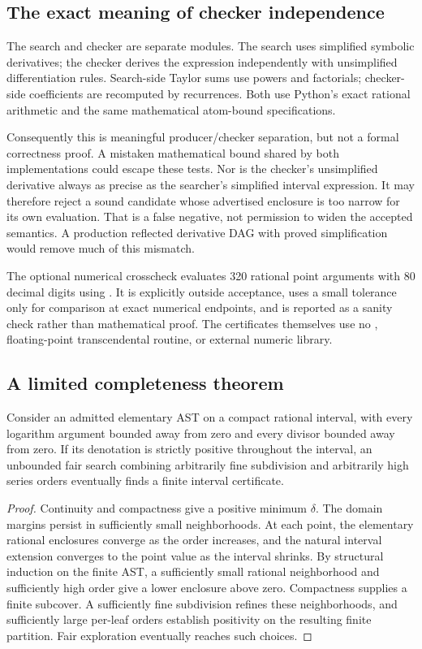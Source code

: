 \subsection{The exact meaning of checker independence}
The search and checker are separate modules. The search uses simplified symbolic derivatives; the checker derives the expression independently with unsimplified differentiation rules. Search-side Taylor sums use powers and factorials; checker-side coefficients are recomputed by recurrences. Both use Python's exact rational arithmetic and the same mathematical atom-bound specifications.

Consequently this is meaningful producer/checker separation, but not a formal correctness proof. A mistaken mathematical bound shared by both implementations could escape these tests. Nor is the checker's unsimplified derivative always as precise as the searcher's simplified interval expression. It may therefore reject a sound candidate whose advertised enclosure is too narrow for its own evaluation. That is a false negative, not permission to widen the accepted semantics. A production reflected derivative DAG with proved simplification would remove much of this mismatch.

The optional numerical crosscheck evaluates 320 rational point arguments with 80 decimal digits using . It is explicitly outside acceptance, uses a small tolerance only for comparison at exact numerical endpoints, and is reported as a sanity check rather than mathematical proof. The certificates themselves use no , floating-point transcendental routine, or external numeric library.

\subsection{A limited completeness theorem}
\begin{theorem}\label{thm:robust}
Consider an admitted elementary AST on a compact rational interval, with every logarithm argument bounded away from zero and every divisor bounded away from zero. If its denotation is strictly positive throughout the interval, an unbounded fair search combining arbitrarily fine subdivision and arbitrarily high series orders eventually finds a finite interval certificate.
\end{theorem}
\begin{proof}
Continuity and compactness give a positive minimum \(\delta\). The domain margins persist in sufficiently small neighborhoods. At each point, the elementary rational enclosures converge as the order increases, and the natural interval extension converges to the point value as the interval shrinks. By structural induction on the finite AST, a sufficiently small rational neighborhood and sufficiently high order give a lower enclosure above zero. Compactness supplies a finite subcover. A sufficiently fine subdivision refines these neighborhoods, and sufficiently large per-leaf orders establish positivity on the resulting finite partition. Fair exploration eventually reaches such choices.
\end{proof}


